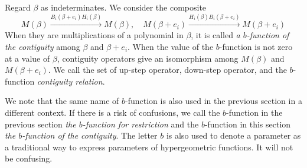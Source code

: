 \documentclass{article}
\begin{document}
Regard $\beta$ as indeterminates. 
We consider the composite
\begin{equation}  \label{eq:b-function-for-contiguity}
  M(\beta) \stackrel{B_i(\beta+e_i) H_i(\beta)}{\longrightarrow} M(\beta),
\quad
  M(\beta+e_i) \stackrel{H_i(\beta)B_i(\beta+e_i)}{\longrightarrow} M(\beta+e_i)
\end{equation}
When they are multiplications of a polynomial in $\beta$, 
it is called {\it a $b$-function of the contiguity} among $\beta$ and $\beta+e_i$.
When the value of the $b$-function is not zero at a value of $\beta$,
contiguity operators give an isomorphism among
$M(\beta)$ and $M(\beta+e_i)$.
We call the set of up-step operator, down-step operator, and the $b$-function 
{\it contiguity relation}\/.



We note that the same name of $b$-function is also used in the previous section
in a different context.
If there is a risk of confusions,
we call the $b$-function in the previous section
{\it the $b$-function for restriction} and the $b$-function in this section
{\it the $b$-function of the contiguity}.
The letter $b$ is also used to denote a parameter as a traditional way
to express parameters of hypergeometric functions.
It will not be confusing.
\end{document}
